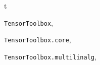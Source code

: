 \documentclass[a4paper,10pt,english]{sphinxmanual}
\begin{document}
\renewcommand{\indexname}{Python Module Index}
\begin{theindex}
\def\bigletter#1{{\Large\sffamily#1}\nopagebreak\vspace{1mm}}
\bigletter{t}
\item {\texttt{TensorToolbox}}, \pageref{api-wttvec:module-TensorToolbox}
\item {\texttt{TensorToolbox.core}}, \pageref{api-core:module-TensorToolbox.core}
\item {\texttt{TensorToolbox.multilinalg}}, \pageref{api-multilinalg:module-TensorToolbox.multilinalg}
\end{theindex}

\renewcommand{\indexname}{Index}
\printindex
\end{document}
